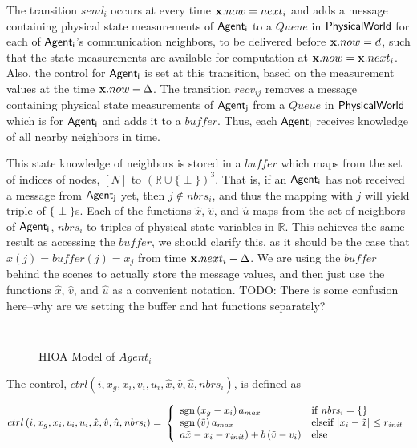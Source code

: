 \documentclass[10pt, conference, compsocconf]{IEEEtran}
\begin{document}
The transition $send_i$ occurs at every time ${\bf x}.now = next_i$ and adds a message containing physical state measurements of ${\operatorname{\mathsf{Agent_i}}}$ to a $Queue$ in ${\operatorname{\mathsf{PhysicalWorld}}}$ for each of ${\operatorname{\mathsf{Agent_i}}}$'s communication neighbors, to be delivered before ${\bf x}.now = d$, such that the state measurements are available for computation at ${\bf x}.now = {\bf x}.next_i$.  Also, the control for ${\operatorname{\mathsf{Agent_i}}}$ is set at this transition, based on the measurement values at the time ${\bf x}.now - \Delta$.
%
The transition $recv_{ij}$ removes a message containing physical state measurements of ${\operatorname{\mathsf{Agent_j}}}$ from a $Queue$ in ${\operatorname{\mathsf{PhysicalWorld}}}$ which is for ${\operatorname{\mathsf{Agent_i}}}$ and adds it to a $\mathit{buffer}$.
%
Thus, each ${\operatorname{\mathsf{Agent_i}}}$ receives knowledge of all nearby neighbors in time.

This state knowledge of neighbors is stored in a $\mathit{buffer}$ which maps from the set of indices of nodes, $[N]$ to $(\mathbb{R} \cup \{\perp\})^3$.  That is, if an ${\operatorname{\mathsf{Agent_i}}}$ has not received a message from ${\operatorname{\mathsf{Agent_j}}}$ yet, then $j \notin \mathit{nbrs}_i$, and thus the mapping with $j$ will yield triple of $\{\perp\}$s.
%
Each of the functions $\hat{x}$, $\hat{v}$, and $\hat{u}$ maps from the set of neighbors of ${\operatorname{\mathsf{Agent_i}}}$, $\mathit{nbrs}_i$ to triples of physical state variables in $\mathbb{R}$.  This achieves the same result as accessing the $\mathit{buffer}$, we should clarify this, as it should be the case that $\hat{x}(j)=\mathit{buffer}(j)=x_j$ from time ${\bf x}.next_i - \Delta$.  We are using the $\mathit{buffer}$ behind the scenes to actually store the message values, and then just use the functions $\hat{x}$, $\hat{v}$, and $\hat{u}$ as a convenient notation. TODO: There is some confusion here--why are we setting the buffer and hat functions separately?

\begin{figure}[h!]
\centering
  \hrule
  {}
  \hrule
  \caption{HIOA Model of $Agent_i$}
  \label{fig:agent_i}
\end{figure}

The control, $ctrl(i, x_g, x_i, v_i, u_i, \hat{x}, \hat{v}, \hat{u}, \mathit{nbrs}_i)$, is defined as

$ctrl\left(i, x_g, x_i, v_i, u_i, \hat{x}, \hat{v}, \hat{u}, \mathit{nbrs}_i \right) = \\
	\left\{
		\begin{array}{ll}
			\operatorname{sgn} \left( x_g - x_i \right)a_{max} & \textrm{if } \mathit{nbrs}_i = \{\} \\
			\operatorname{sgn} \left( \tilde{v} \right)a_{max} & \textrm{elseif } \lvert x_i - \tilde{x}\rvert \leq r_{init} \\
			a\tilde{x} - x_i - r_{init}) + b\left(\tilde{v} - v_i\right) & \textrm{else}
		\end{array}
	\right.$
\end{document}

